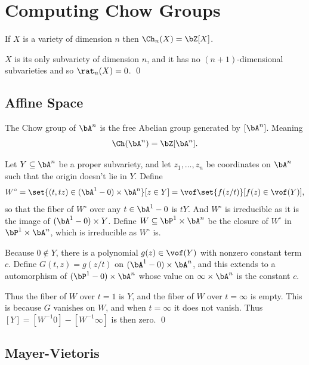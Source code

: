 \section{Computing Chow Groups}

\blemm

    If $X$ is a variety of dimension $n$ then $\Ch_n(X)=\bZ[X]$.

\elemm

\bproof

    $X$ is its only subvariety of dimension $n$, and it has no $(n+1)$-dimensional subvarieties and
    so $\rat_n(X)=0$.
    \qed

\eproof

\subsection{Affine Space}

\bprop[name={chowaffine}]

    The Chow group of $\bA^n$ is the free Abelian group generated by $[\bA^n]$.
    Meaning
    $$ \Ch(\bA^n) = \bZ[\bA^n] . $$

\eprop

\bproof

    Let $Y\subseteq\bA^n$ be a proper subvariety, and let $z_1,\dots,z_n$ be coordinates on $\bA^n$
    such that the origin doesn't lie in $Y$.
    Define
    $$ W^\circ = \set{(t,tz)\in(\bA^1-0)\times\bA^n}[z\in Y] = \vof\set{f(z/t)}[f(z)\in\vof(Y)] , $$
    so that the fiber of $W^\circ$ over any $t\in\bA^1-0$ is $tY$.
    And $W^\circ$ is irreducible as it is the image of $(\bA^1-0)\times Y$.
    Define $W\subseteq\bP^1\times\bA^n$ be the closure of $W^\circ$ in $\bP^1\times\bA^n$, which is irreducible
    as $W^\circ$ is.

    Because $0\notin Y$, there is a polynomial $g(z)\in\vof(Y)$ with nonzero constant term $c$.
    Define $G(t,z)=g(z/t)$ on $(\bA^1-0)\times\bA^n$, and this extends to a automorphism of
    $(\bP^1-0)\times\bA^n$ whose value on $\infty\times\bA^n$ is the constant $c$.

    Thus the fiber of $W$ over $t=1$ is $Y$, and the fiber of $W$ over $t=\infty$ is empty.
    This is because $G$ vanishes on $W$, and when $t=\infty$ it does not vanish.
    Thus $[Y]=[W^{-1}0]-[W^{-1}\infty]$ is then zero.
    \qed

\eproof

\subsection{Mayer-Vietoris}

